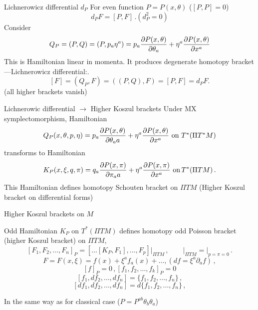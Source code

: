 \documentclass{beamer}
\def\p{\partial}
\def\p {\partial}
\begin{document}
\begin{frame}{Lichnerowicz differential $d_P$}
For even function $P=P(x,\theta)$ ($[P,P]=0$)
        $$
d_P F=[P,F]  \,. (d_P^2=0)
        $$
Consider  $$
Q_P=(P,Q)=(P,p_a\eta^a)=
p_a{\p P(x,\theta)\over \p \theta_a}+
\eta^a{\p P(x,\theta)\over \p x^a}
        $$
This is Hamiltonian linear in momenta. It produces
degenerate homotopy bracket---Lichnerowicz differential:. 
        $$
[F]=(Q_P,F)=((P,Q),F)=[P,F]=d_P F. 
       $$ 
(all higher brackets vanish)
     \end{frame}

\begin{frame}{Lichnerowic differential $\to$ Higher Koszul brackets}
  Under MX symplectomorphism, Hamiltonian 
     $$
Q_P(x,\theta,p,\eta)=
p_a{\p P(x,\theta)\over \p \theta_aa}+
\eta^a{\p P(x,\theta)\over \p x^a}
\,\,\hbox {on $T^*(\Pi T^*M)$}
      $$
 transforms to Hamiltonian
      $$
K_P(x,\xi,q,\pi)=
q_a{\p P(x,\pi)\over \p \pi_aa}+
\eta^a{\p P(x,\pi)\over \p x^a}
 \,\, {\rm on}\,  T^*(\Pi TM) \,.   $$
This Hamiltonian defines homotopy Schouten bracket
on $\Pi TM$ (Higher Koszul bracket on differential forms)
\end{frame}
\begin{frame}{Higher Koszul brackets on $M$}
 
Odd Hamiltonian  $K_P$ on  $T^*(\Pi TM)$ 
defines  homotopy odd Poisson bracket 
(higher Koszul bracket) on  $\Pi TM$,
            $$
        [F_1,F_2,\dots,F_n]_P=
  \left[\dotsc\left[K_P,F_1\right],\dots,F_p\right]\big\vert_{\Pi TM}\,,\qquad
          \big\vert_{\Pi TM}=\big\vert_{p=\pi=0}\,.
           $$
           $$
   F=F(x,\xi)=f(x)+\xi^af_a(x)+\dots,    (df=\xi^a\p_a f)\,,
                     $$
              $$
     [f]_P=0\,,  [f_1,f_2,\dots,f_k]_P=0
          $$
          $$
        [f_1,df_2,\dots,df_n]=\{f_1,f_2,\dots,f_n\}\,,
           $$
          $$
        [df_1,df_2,\dots,df_n]=d\{f_1,f_2,\dots,f_n\}\,,
           $$


In the same way as for classical case ($P=P^{ab}\theta_b\theta_a$)
       
\end{frame}
\end{document}
